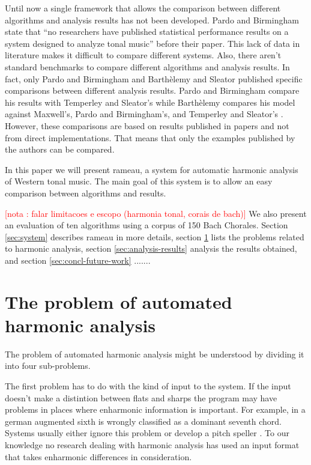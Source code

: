 \documentclass{article}
\newcounter{notacounter}
\newcommand{\nota}[1]{
  \addtocounter{notacounter}{1}
  \textcolor{red}{[nota \arabic{notacounter}: #1]}
}
\begin{document}
Until now a single framework that allows the comparison between
different algorithms and analysis results has not been developed.
Pardo and Birmingham state that ``no researchers have published
statistical performance results on a system designed to analyze tonal
music'' \cite{pardo02:algorithms} before their paper. This lack of
data in literature makes it difficult to compare different systems.
Also, there aren't standard benchmarks to compare different algorithms
and analysis results. In fact, only Pardo and Birmingham
\cite{pardo00:automated} and Barthèlemy and Sleator
\cite{barthelemy01:figured} published specific comparisons between
different analysis results. Pardo and Birmingham compare his results
with Temperley and Sleator's \cite{temperley99:modeling} while
Barthèlemy compares his model against Maxwell's, Pardo and
Birmingham's, and Temperley and Sleator's
\cite{maxwell92:expert,temperley96:algorithm,pardo99:automated}.
However, these comparisons are based on results published in papers
and not from direct implementations. That means that only the examples
published by the authors can be compared.

In this paper we will present rameau, a system for automatic harmonic
analysis of Western tonal music. The main goal of this system is to
allow an easy comparison between algorithms and results. \nota{falar
  limitacoes e escopo (harmonia tonal, corais de bach)} We also
present an evaluation of ten algorithms using a corpus of 150 Bach
Chorales. Section \ref{sec:system} describes rameau in more details,
section \ref{sec:problem} lists the problems related to harmonic
analysis, section \ref{sec:analysis-results} analysis the results
obtained, and section \ref{sec:concl-future-work} .......

\section{The problem of automated harmonic analysis}
\label{sec:problem}

The problem of automated harmonic analysis might be understood by
dividing it into four sub-problems. 

The first problem has to do with the kind of input to the system. If
the input doesn't make a distintion between flats and sharps the
program may have problems in places where enharmonic information is
important. For example, in \cite{pardo02:algorithms} a german
augmented sixth is wrongly classified as a dominant seventh chord.
Systems usually either ignore this problem or develop a pitch speller
\cite{temperley99:modeling}. To our knowledge no research dealing with
harmonic analysis has used an input format that takes enharmonic
differences in consideration.
\end{document}
